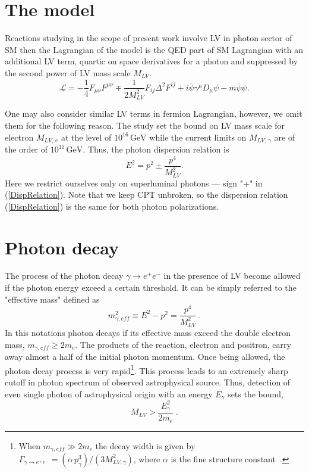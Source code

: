 \documentclass{webofc}
\newcommand{\be}{\begin{equation}}
\newcommand{\ee}{\end{equation}}
\begin{document}
\section{The model}
\label{The model}
Reactions studying in the scope of present work involve LV in photon sector of SM then the Lagrangian of the model is the QED part of SM Lagrangian with an additional LV term, quartic on space derivatives for a photon and suppressed by the second power of LV mass scale $M_{LV}$.
\begin{equation}\label{L1}
\mathcal{L}=-\frac{1}{4}F_{\mu\nu}F^{\mu\nu}  \mp \frac{1}{2 M_{LV}^2}F_{ij}\Delta^2 F^{ij}  +i\bar{\psi}\gamma^\mu D_\mu\psi - m\bar{\psi}\psi . 
\end{equation}

One may also consider similar LV terms in fermion Lagrangian, however, we omit them for the following reason. The study \cite{Liberati:2012jf} set the bound on LV mass scale for electron $M_{LV,\,e}$ at the level of $10^{16}\,\mbox{GeV}$ while the current limits \cite{Vasileiou:2013vra} on $M_{LV,\, \gamma}$  are of the order of $10^{11}\,\mbox{GeV}$. Thus, the photon dispersion relation is
\begin{equation}
\label{DispRelation}
E^2 = p^2 \pm \frac{p^4}{M_{LV}^2}.
\end{equation}
Here we restrict ourselves only on superluminal photons --- sign "+" in (\ref{DispRelation}). Note that we keep CPT unbroken, so the dispersion relation (\ref{DispRelation}) is the same for both photon polarizations.

\section{Photon decay}
\label{Photon decay}
The process of the photon decay 
$\gamma \to e^+e^-$ in the presence of LV become allowed if the photon energy exceed a certain threshold. It can be simply referred to the "effective mass"  defined as 
\be
\label{mgamma}
m^2_{\gamma,eff} \equiv E^2-p^2=\frac{p^4}{M_{LV}^2}\;.
\ee 
In this notations photon decays if its effective mass exceed the double electron mass, $m_{\gamma,eff} \geq 2m_e$. The products of the reaction, electron and positron, carry away almost a half of the initial photon momentum. Once being allowed, the photon decay process is
very rapid\footnote{When $m_{\gamma,eff}\gg 2m_e$ the decay width is given
by
$\Gamma_{\gamma\to e^+e^-}=(\alpha\, p_\gamma^3)/(3 M_{LV,\gamma}^2)$,
where $\alpha$ is the fine structure constant~\cite{Rubtsov:2012kb}.}. 
This process leads to an extremely sharp cutoff in photon spectrum of observed
astrophysical source. Thus, detection of even single 
photon of astrophysical origin with an energy $E_\gamma$ sets the
bound,
\be
\label{photondecaybound}
M_{LV} > \frac{E_\gamma^2}{2m_e}\;.
\ee
 
\end{document}
